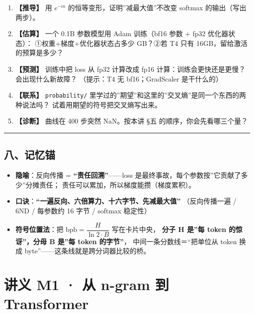 \documentclass[
  chinese,
  11pt,
]{ctexart}
\providecommand{\tightlist}{%
  \setlength{\itemsep}{0pt}\setlength{\parskip}{0pt}}
\begin{document}
\begin{enumerate}
\def\labelenumi{\arabic{enumi}.}
\tightlist
\item
  \textbf{【推导】} 用 \(e^{-m}\) 的恒等变形，证明''减最大值''不改变 softmax 的输出（写出两步）。
\item
  \textbf{【估算】} 一个 0.1B 参数模型用 Adam 训练（bf16 参数 + fp32 优化器状态）： ①权重+梯度+优化器状态占多少 GB？②若 T4 只有 16GB，留给激活的预算是多少？
\item
  \textbf{【预测】} 训练中把 loss 从 fp32 计算改成 fp16 计算：训练会更快还是更慢？会出现什么新故障？ （提示：T4 无 bf16；GradScaler 是干什么的）
\item
  \textbf{【联系】} \texttt{probability/} 里学过的''期望''和这里的''交叉熵''是同一个东西的两种说法吗？ 试着用期望的符号把交叉熵写出来。
\item
  \textbf{【诊断】} 曲线在 400 步突然 NaN。按本讲 §五 的顺序，你会先看哪三个量？
\end{enumerate}

\begin{center}\rule{0.5\linewidth}{0.5pt}\end{center}

\subsection{八、记忆锚}\label{ux516bux8bb0ux5fc6ux951a}

\begin{itemize}
\tightlist
\item
  \textbf{隐喻}：反向传播 = \textbf{``责任回溯''}------loss 是最终事故，每个参数按''它贡献了多少''分摊责任； 责任可以累加，所以梯度能攒（梯度累积）。
\item
  \textbf{口诀}：\textbf{``一遍反向、六倍算力、十六字节、先减最大值''} （反向传播一遍 / 6ND / 每参数约 16 字节 / softmax 稳定性）
\item
  \textbf{符号位置法}：把 \(\mathrm{bpb} = \dfrac{H}{\ln 2 \cdot B}\) 写在卡片中央， \textbf{分子 H 是''每 token 的惊讶''，分母 B 是''每 token 的字节''}， 中间一条分数线＝``把单位从 token 换成 byte''------这条线就是跨分词器比较的桥。
\end{itemize}

\newpage

\section{讲义 M1 · 从 n-gram 到 Transformer}\label{ux8bb2ux4e49-m1-ux4ece-n-gram-ux5230-transformer}
\end{document}
